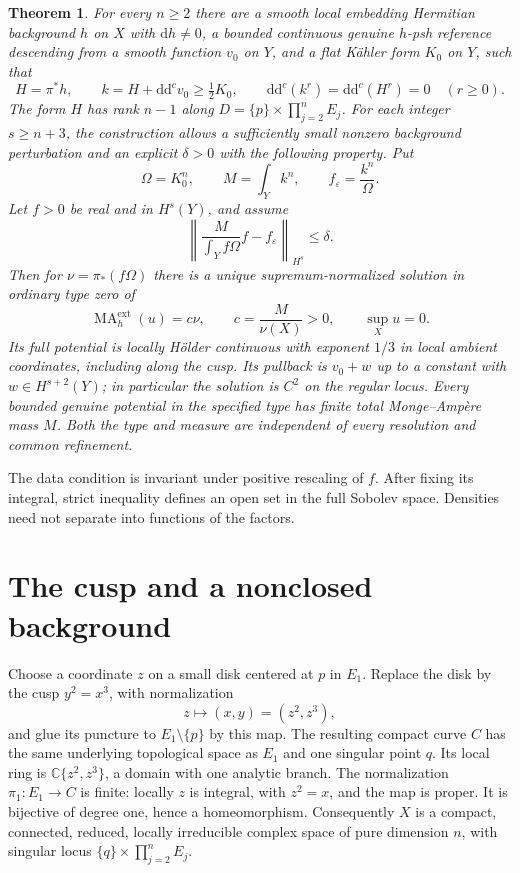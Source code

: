 \documentclass[11pt]{article}
\newtheorem{theorem}{Theorem}[section]
\newcommand{\ddc}{\mathrm{d}\mathrm{d}^c}
\newcommand{\MA}{\operatorname{MA}}
\newcommand{\eps}{\varepsilon}
\newcommand{\Om}{\Omega}
\begin{document}
\begin{theorem}\label{thm:main}
For every $n\ge2$ there are a smooth local embedding Hermitian background $h$ on $X$ with
$\mathrm{d}h\ne0$, a bounded continuous genuine $h$-psh reference descending
from a smooth function $v_0$ on $Y$, and a flat K\"ahler form $K_0$ on $Y$,
such that
\[
 H=\pi^*h,\qquad k=H+\ddc v_0\ge\tfrac12K_0,
 \qquad \ddc(k^r)=\ddc(H^r)=0\quad(r\ge0).
\]
The form $H$ has rank $n-1$ along $D=\{p\}\times\prod_{j=2}^nE_j$.
For each integer $s\ge n+3$, the construction allows a sufficiently small
nonzero background perturbation and an explicit $\delta>0$ with the
following property. Put
\[
 \Om=K_0^n,\qquad M=\int_Y k^n,\qquad f_\eps=\frac{k^n}{\Om}.
\]
Let $f>0$ be real and in $H^s(Y)$, and assume
\begin{equation}\label{eq:data-condition}
 \left\|\frac{M}{\int_Yf\Om}f-f_\eps\right\|_{H^s}\le\delta.
\end{equation}
Then for $\nu=\pi_*(f\Om)$ there is a unique supremum-normalized solution
in ordinary type zero of
\[
 \MA^{\mathrm{ext}}_h(u)=c\nu,\qquad
 c=\frac{M}{\nu(X)}>0,\qquad \sup_Xu=0.
\]
Its full potential is locally H\"older continuous with exponent $1/3$ in
local ambient coordinates, including along the cusp. Its pullback is
$v_0+w$ up to a constant with $w\in H^{s+2}(Y)$; in particular the solution
is $C^2$ on the regular locus. Every bounded genuine potential in the
specified type has finite total Monge--Amp\`ere mass $M$.
Both the type and measure are independent of every resolution and common
refinement.
\end{theorem}

The data condition is invariant under positive rescaling of $f$. After fixing
its integral, strict inequality defines an open set in the full Sobolev
space. Densities need not separate into functions of the factors.

\section{The cusp and a nonclosed background}\label{sec:geometry}

Choose a coordinate $z$ on a small disk centered at $p$ in $E_1$. Replace
the disk by the cusp $y^2=x^3$, with normalization
\[
 z\longmapsto (x,y)=(z^2,z^3),
\]
and glue its puncture to $E_1\setminus\{p\}$ by this map.
The resulting compact curve $C$ has the same underlying topological space
as $E_1$ and one singular point $q$. Its local ring is
$\mathbb C\{z^2,z^3\}$, a domain with one analytic branch. The normalization
$\pi_1:E_1\to C$ is finite: locally $z$ is integral, with $z^2=x$, and
the map is proper. It is bijective of degree one, hence a homeomorphism.
Consequently $X$ is a compact, connected, reduced, locally irreducible
complex space of pure dimension $n$, with singular locus
$\{q\}\times\prod_{j=2}^nE_j$.
\end{document}
